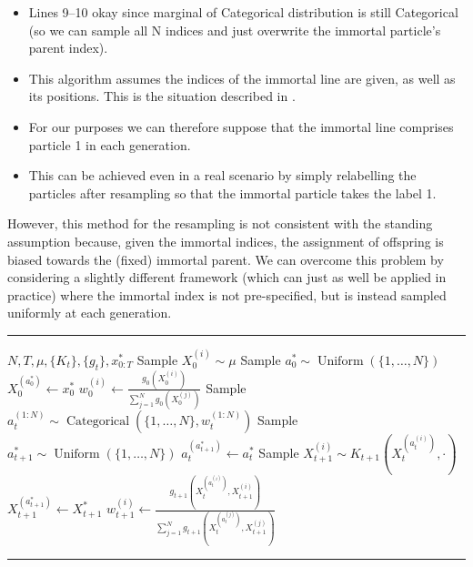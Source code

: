 \documentclass[fleqn]{article}
\newcommand{\Cat}{\operatorname{Categorical}}
\newcommand{\Unif}{\operatorname{Uniform}}
\begin{document}
\begin{itemize}
\item Lines 9--10 okay since marginal of Categorical distribution is still Categorical (so we can sample all N indices and just overwrite the immortal particle's parent index).
\item This algorithm assumes the indices of the immortal line are given, as well as its positions. This is the situation described in \citet{andrieu2010}.
\item For our purposes we can therefore suppose that the immortal line comprises particle 1 in each generation.
\item This can be achieved even in a real scenario by simply relabelling the particles after resampling so that the immortal particle takes the label 1.
\end{itemize}

However, this method for the resampling is not consistent with the standing assumption because, given the immortal indices, the assignment of offspring is biased towards the (fixed) immortal parent.
We can overcome this problem by considering a slightly different framework (which can just as well be applied in practice) where the immortal index is not pre-specified, but is instead sampled uniformly at each generation.\\

\hrule
\begin{algorithmic}[1]
\Require $N, T, \mu, \{K_t\}, \{g_t\}, x_{0:T}^*$
	\State Sample $X_0^{(i)} \sim \mu$ 
\EndFor
\State Sample $a_0^* \sim \Unif(\{1,\dots,N\})$
\State $X_0^{(a_0^*)} \gets x_0^*$
	\State $w_0^{(i)} \gets \frac{g_0(X_0^{(i)})}{\sum_{j=1}^N g_0(X_0^{(j)})}$
\EndFor
{}
	\State Sample $a_t^{(1:N)} \sim \Cat(\{1,\dots,N\}, w_t^{(1:N)})$
	\State Sample $a_{t+1}^* \sim \Unif(\{1,\dots,N\})$
	\State $a_t^{(a_{t+1}^*)} \gets a_t^*$
		\State Sample $X_{t+1}^{(i)} \sim K_{t+1}(X_t^{(a_t^{(i)})}, \cdot)$
	\EndFor
	\State $X_{t+1}^{(a_{t+1}^*)} \gets X_{t+1}^*$
		\State $w_{t+1}^{(i)} \gets \frac{g_{t+1}(X_t^{(a_t^{(i)})} , X_{t+1}^{(i)})}{\sum_{j=1}^N g_{t+1}(X_t^{(a_t^{(j)})} , X_{t+1}^{(j)})}$
	\EndFor
\EndFor
\end{algorithmic}
\hrule


\end{document}
